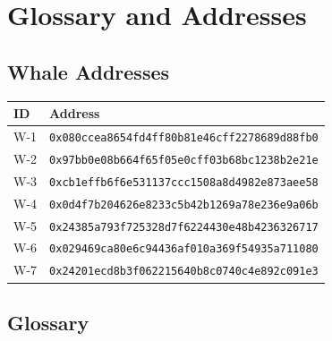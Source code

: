 \section{Glossary and Addresses}
\label{sec:glossary}

\subsection*{Whale Addresses}

\begin{tabular}{ll}
\hline
\textbf{ID} & \textbf{Address} \\
\hline
W-1 & \texttt{0x080ccea8654fd4ff80b81e46cff2278689d88fb0} \\
W-2 & \texttt{0x97bb0e08b664f65f05e0cff03b68bc1238b2e21e} \\
W-3 & \texttt{0xcb1effb6f6e531137ccc1508a8d4982e873aee58} \\
W-4 & \texttt{0x0d4f7b204626e8233c5b42b1269a78e236e9a06b} \\
W-5 & \texttt{0x24385a793f725328d7f6224430e48b4236326717} \\
W-6 & \texttt{0x029469ca80e6c94436af010a369f54935a711080} \\
W-7 & \texttt{0x24201ecd8b3f062215640b8c0740c4e892c091e3} \\
\hline
\end{tabular}

\subsection*{Glossary}

